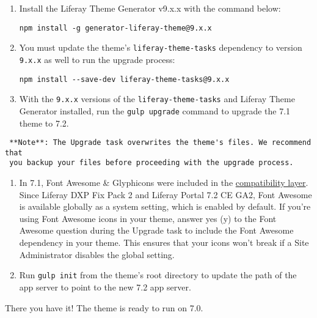 \begin{enumerate}
\def\labelenumi{\arabic{enumi}.}
\item
  Install the Liferay Theme Generator v9.x.x with the command below:

\begin{verbatim}
npm install -g generator-liferay-theme@9.x.x
\end{verbatim}
\item
  You must update the theme's \texttt{liferay-theme-tasks} dependency to
  version \texttt{9.x.x} as well to run the upgrade process:

\begin{verbatim}
npm install --save-dev liferay-theme-tasks@9.x.x
\end{verbatim}
\item
  With the \texttt{9.x.x} versions of the \texttt{liferay-theme-tasks}
  and Liferay Theme Generator installed, run the \texttt{gulp\ upgrade}
  command to upgrade the 7.1 theme to 7.2.
\end{enumerate}

\noindent\hrulefill

\begin{verbatim}
 **Note**: The Upgrade task overwrites the theme's files. We recommend that 
 you backup your files before proceeding with the upgrade process.
\end{verbatim}

\noindent\hrulefill

\begin{enumerate}
\def\labelenumi{\arabic{enumi}.}
\setcounter{enumi}{3}
\item
  In 7.1, Font Awesome \& Glyphicons were included in the
  \href{/docs/7-1/tutorials/-/knowledge_base/t/using-the-bootstrap-3-lexicon-css-compatibility-layer}{compatibility
  layer}. Since Liferay DXP Fix Pack 2 and Liferay Portal 7.2 CE GA2,
  Font Awesome is available globally as a system setting, which is
  enabled by default. If you're using Font Awesome icons in your theme,
  answer yes (y) to the Font Awesome question during the Upgrade task to
  include the Font Awesome dependency in your theme. This ensures that
  your icons won't break if a Site Administrator disables the global
  setting.
\item
  Run \texttt{gulp\ init} from the theme's root directory to update the
  path of the app server to point to the new 7.2 app server.
\end{enumerate}

There you have it! The theme is ready to run on 7.0.

